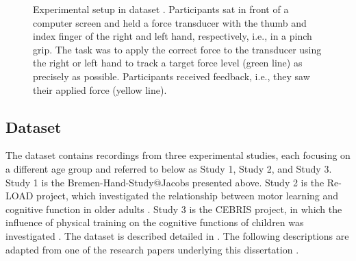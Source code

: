 \begin{figure}[h]
\begin{center}

\caption[Experimental setup in dataset .]{Experimental setup in dataset . Participants sat in front of a computer screen and held a force transducer with the thumb and index finger of the right and left hand, respectively, i.e., in a pinch grip. The task was to apply the correct force to the transducer using the right or left hand to track a target force level (green line) as precisely as possible. Participants received feedback, i.e., they saw their applied force (yellow line).}
\label{fig:BHS_exp1}
\end{center}
\end{figure}

\subsection{Dataset }
\label{methods:datasets:II}
The  dataset contains recordings from three experimental studies, each focusing on a different age group and referred to below as Study 1, Study 2, and Study 3. Study 1 is the Bremen-Hand-Study@Jacobs presented above. Study 2 is the Re-LOAD project, which investigated the relationship between motor learning and cognitive function in older adults \cite{HUBNER2018104, Hübner2018}. Study 3 is the CEBRIS project, in which the influence of physical training on the cognitive functions of children was investigated \cite{Koutsandreou2016}. The dataset is described detailed in \cite{Reuter2019}. The following descriptions are adapted from one of the research papers underlying this dissertation \cite{Goelz2023}.

